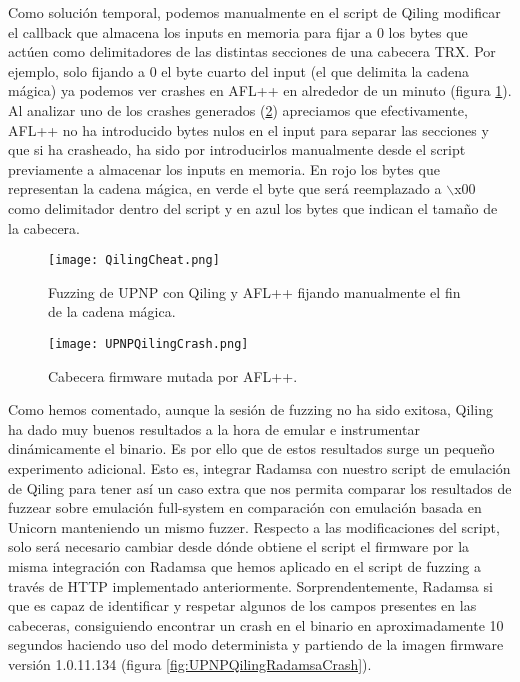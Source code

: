 Como solución temporal, podemos manualmente en el script de Qiling modificar el callback que almacena los inputs en memoria para fijar a 0
los bytes que actúen como delimitadores de las distintas secciones de una cabecera TRX. Por ejemplo, solo fijando a 0 el byte cuarto del input
(el que delimita la cadena mágica) ya podemos ver crashes en AFL++ en alrededor de un minuto (figura \ref{fig:QilingCheat}). Al analizar uno 
de los crashes generados (\ref{fig:UPNPQilingCrash}) apreciamos que efectivamente, AFL++ no ha introducido bytes nulos en el input para
separar las secciones y que si ha crasheado, ha sido por introducirlos manualmente desde el script previamente a almacenar los inputs en memoria.
En rojo los bytes que representan la cadena mágica, en verde el byte que será reemplazado a $\backslash$x00 como delimitador dentro del script y en
azul los bytes que indican el tamaño de la cabecera.

\begin{figure}[H]
    \centering
    \texttt{[image: QilingCheat.png]}
    \caption{Fuzzing de UPNP con Qiling y AFL++ fijando manualmente el fin de la cadena mágica.}
    \label{fig:QilingCheat}
\end{figure}

\begin{figure}[H]
    \centering
    \texttt{[image: UPNPQilingCrash.png]}
    \caption{Cabecera firmware mutada por AFL++.}
    \label{fig:UPNPQilingCrash}
\end{figure}

Como hemos comentado, aunque la sesión de fuzzing no ha sido exitosa, Qiling ha dado muy buenos resultados a la hora de emular e instrumentar dinámicamente 
el binario. Es por ello que de estos resultados surge un pequeño experimento adicional. Esto es, integrar Radamsa con nuestro script de emulación de Qiling
para tener así un caso extra que nos permita comparar los resultados de fuzzear sobre emulación full-system en comparación con emulación basada en Unicorn 
manteniendo un mismo fuzzer. Respecto a las modificaciones del script, solo será necesario cambiar desde dónde obtiene el script el firmware por la misma
integración con Radamsa que hemos aplicado en el script de fuzzing a través de HTTP implementado anteriormente. Sorprendentemente, Radamsa
si que es capaz de identificar y respetar algunos de los campos presentes en las cabeceras, consiguiendo encontrar un crash en el binario
en aproximadamente 10 segundos haciendo uso del modo determinista y partiendo de la imagen firmware versión 1.0.11.134 (figura \ref{fig:UPNPQilingRadamsaCrash}).

